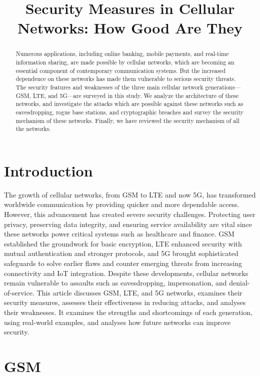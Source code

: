 \documentclass[conference]{IEEEtran}
\title{Security Measures in Cellular Networks: How Good Are They}
\begin{document}
\maketitle

\begin{abstract}
 Numerous applications, including online banking, mobile payments, and real-time information sharing, are made possible by cellular networks, which are becoming an essential component of contemporary communication systems. But the increased dependence on these networks has made them vulnerable to serious security threats. The security features and weaknesses of the three main cellular network generations—GSM, LTE, and 5G—are surveyed in this study. We analyze the architecture of these networks, and investigate the attacks which are possible against these networks such as eavesdropping, rogue base stations, and cryptographic breaches and survey the security mechanism of these networks. Finally, we have reviewed the security mechanism of all the networks.

\end{abstract}

\section{Introduction}
The growth of cellular networks, from GSM to LTE and now 5G, has transformed worldwide communication by providing quicker and more dependable access. However, this advancement has created severe security challenges. Protecting user privacy, preserving data integrity, and ensuring service availability are vital since these networks power critical systems such as healthcare and finance.
GSM established the groundwork for basic encryption, LTE enhanced security with mutual authentication and stronger protocols, and 5G brought sophisticated safeguards to solve earlier flaws and counter emerging threats from increasing connectivity and IoT integration. Despite these developments, cellular networks remain vulnerable to assaults such as eavesdropping, impersonation, and denial-of-service.
This article discusses GSM, LTE, and 5G networks, examines their security measures, assesses their effectiveness in reducing attacks, and analyses their weaknesses. It examines the strengths and shortcomings of each generation, using real-world examples, and analyses how future networks can improve security.
 

\section{GSM}
\end{document}
